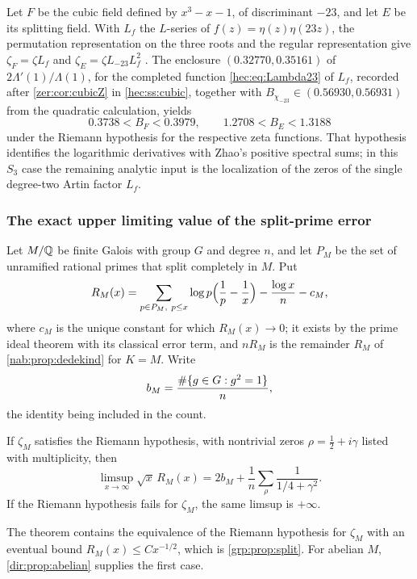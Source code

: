 \begin{example}\label{zer:ex:cubic23}
Let $F$ be the cubic field defined by $x^3-x-1$, of discriminant $-23$, and let $E$ be
its splitting field. With $L_f$ the $L$-series of $f(z)=\eta(z)\eta(23z)$, the permutation
representation on the three roots and the regular representation give
$\zeta_F=\zeta L_f$ and $\zeta_E=\zeta L_{-23}L_f^2$
\cite{Zagier1991Polylogarithms}. The enclosure $(0.32770,0.35161)$ of
$2\Lambda'(1)/\Lambda(1)$, for the completed function \eqref{hec:eq:Lambda23} of $L_f$, recorded
after \cref{zer:cor:cubicZ} in \cref{hec:ss:cubic}, together with
$B_{\chi_{-23}}\in(0.56930,0.56931)$ from the quadratic calculation, yields
\[
 0.3738<B_F<0.3979,\qquad1.2708<B_E<1.3188
\]
under the Riemann hypothesis for the respective zeta functions. That hypothesis identifies
the logarithmic derivatives with Zhao's positive spectral sums; in this $S_3$ case the
remaining analytic input is the localization of the zeros of the single degree-two Artin
factor $L_f$.
\end{example}

\subsubsection{The exact upper limiting value of the split-prime error}
Let $M/\mathbb{Q}$ be finite Galois with group $G$ and degree $n$, and let $P_M$ be the set of
unramified rational primes that split completely in $M$. Put
\[
 R_M(x)=\sum_{p\in P_M,\ p\le x}\log p\Bigl(\frac1p-\frac1x\Bigr)-\frac{\log x}n-c_M,
\]
where $c_M$ is the unique constant for which $R_M(x)\to0$; it exists by the prime ideal
theorem with its classical error term, and $nR_M$ is the remainder $R_M$ of
\cref{nab:prop:dedekind} for $K=M$. Write
\[
 b_M=\frac{\#\{g\in G:g^2=1\}}n,
\]
the identity being included in the count.

\begin{theorem}\label{zer:thm:endpoint}
If $\zeta_M$ satisfies the Riemann hypothesis, with nontrivial zeros
$\rho=\tfrac12+i\gamma$ listed with multiplicity, then
\[
 \limsup_{x\to\infty}\sqrt x\,R_M(x)=2b_M+\frac1n\sum_\rho\frac1{1/4+\gamma^2}.
\]
If the Riemann hypothesis fails for $\zeta_M$, the same limsup is $+\infty$.
\end{theorem}

The theorem contains the equivalence of the Riemann hypothesis for $\zeta_M$ with an eventual
bound $R_M(x)\le Cx^{-1/2}$, which is \cref{grp:prop:split}. For abelian $M$,
\cref{dir:prop:abelian} supplies the first case.


